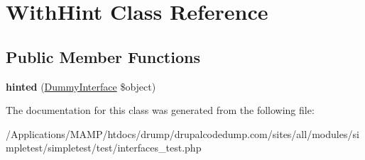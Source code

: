 \hypertarget{class_with_hint}{
\section{WithHint Class Reference}
\label{class_with_hint}
}
\subsection*{Public Member Functions}
\begin{DoxyCompactItemize}
\item 
\hypertarget{class_with_hint_aa9c1fff11d0c798443bddce6de397182}{
{\bfseries hinted} (\hyperlink{interface_dummy_interface}{DummyInterface} \$object)}
\label{class_with_hint_aa9c1fff11d0c798443bddce6de397182}

\end{DoxyCompactItemize}


The documentation for this class was generated from the following file:\begin{DoxyCompactItemize}
\item 
/Applications/MAMP/htdocs/drump/drupalcodedump.com/sites/all/modules/simpletest/simpletest/test/interfaces\_\-test.php\end{DoxyCompactItemize}
